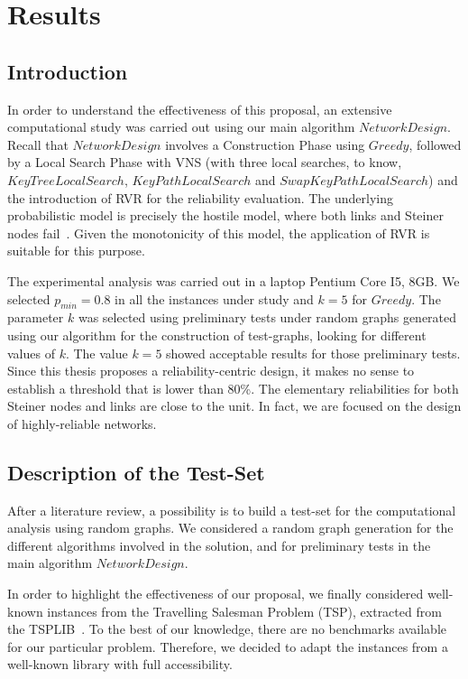 \chapter{Results}\label{results} 

\section{Introduction}
In order to understand the effectiveness of this proposal, an extensive computational study 
was carried out using our main algorithm $NetworkDesign$. Recall that $NetworkDesign$ 
involves a Construction Phase using $Greedy$, followed by a Local Search Phase with VNS 
(with three local searches, to know, $KeyTreeLocalSearch$, 
$KeyPathLocalSearch$ and $SwapKeyPathLocalSearch$) and the introduction of RVR for the reliability evaluation. The underlying probabilistic model is precisely the hostile model, 
where both links and Steiner nodes fail~\cite{103}. Given the monotonicity of this model, the application of RVR is suitable for this purpose. 

The experimental analysis was carried out in a laptop Pentium Core I5, 8GB. We selected 
$p_{min}=0.8$ in all the instances under study and $k=5$ for $Greedy$. 
The parameter $k$ was selected using preliminary tests under random graphs generated using 
our algorithm for the construction of test-graphs, looking for different values of $k$. The value $k=5$ showed acceptable results for those preliminary tests. Since this thesis proposes a  reliability-centric design, it makes no sense to establish a threshold that is lower than 
80\%. The elementary reliabilities for both Steiner nodes and links are close to the unit. In fact, we are focused on the design of highly-reliable networks.

\section{Description of the Test-Set}
After a literature review, a possibility is to build a test-set for the computational analysis using random graphs. We considered a random graph generation for the different algorithms 
involved in the solution, and for preliminary tests in the main algorithm $NetworkDesign$.  

In order to highlight the effectiveness of our proposal, we finally considered well-known instances from the Travelling Salesman Problem (TSP), extracted from the TSPLIB~\cite{24}. 
To the best of our knowledge, there are no benchmarks available for our particular problem. Therefore, we decided to adapt the instances from a well-known library with full accessibility. 

